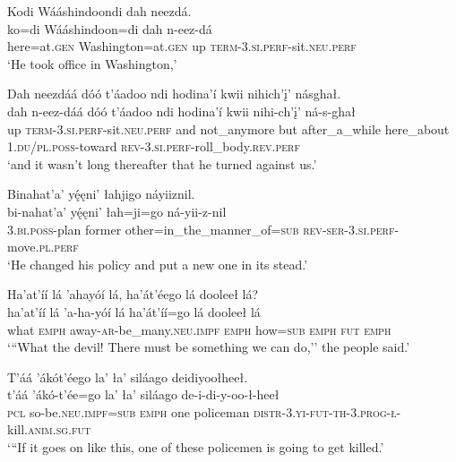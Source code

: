 \ea\label{ex:text7-6-2}
Kodi Wááshindoondi dah neezdá.\\
\gll ko=di	Wááshindoon=di	dah	n-eez-dá\\
     here=at.\textsc{gen}	Washington=at.\textsc{gen}	up	\textsc{term}-3.\textsc{si}.\textsc{perf}-sit.\textsc{neu}.\textsc{perf}\\
\glt `He took office in Washington,'
\z

\ea\label{ex:text7-6-3}
Dah neezdáá dóó t’áadoo ndi hodina’í kwii nihich’į’ násghał.\\
\gll dah	n-eez-dáá	dóó	t’áadoo	ndi	hodina’í	kwii	nihi-ch’į’	ná-s-ghał\\
     up	\textsc{term}-3.\textsc{si}.\textsc{perf}-sit.\textsc{neu}.\textsc{perf}	and	not\_anymore	but	after\_a\_while	here\_about	1.\textsc{du}/\textsc{pl}.\textsc{poss}-toward	\textsc{rev}-3.\textsc{si}.\textsc{perf}-roll\_body.\textsc{rev}.\textsc{perf}\\
\glt `and it wasn't long thereafter that he turned against us.'
\z

\ea\label{ex:text7-6-4}
Binahat’a’ yę́ęni’ łahjigo náyiiznil.\\
\gll bi-nahat’a’	yę́ęni’	łah=ji=go	ná-yii-z-nil\\
     3.\textsc{bi}.\textsc{poss}-plan	former	other=in\_the\_manner\_of=\textsc{sub}	\textsc{rev}-\textsc{ser}-3.\textsc{si}.\textsc{perf}-move.\textsc{pl}.\textsc{perf}\\
\glt `He changed his policy and put a new one in its stead.'
\z

\ea\label{ex:text7-6-5}
Ha’at’íí lá ’ahayóí lá, ha’át’éego lá dooleeł lá?\\
\gll ha’at’íí	lá	’a-ha-yóí	lá	ha’át’íí=go	lá	dooleeł	lá\\
     what	\textsc{emph}	away-\textsc{ar}-be\_many.\textsc{neu}.\textsc{impf}	\textsc{emph}	how=\textsc{sub}	\textsc{emph}	\textsc{fut}	\textsc{emph}\\
\glt `{``}What the devil! There must be something we can do,'' the people said.'
\z

\ea\label{ex:text7-6-6}
T’áá ’ákót’éego la’ ła’ siláago deidiyoołheeł.\\
\gll t’áá	’ákó-t’ée=go	la’	ła’	siláago	de-i-di-y-oo-ł-heeł\\
     \textsc{pcl}	so-be.\textsc{neu}.\textsc{impf}=\textsc{sub}	\textsc{emph}	one	policeman	\textsc{distr}-3.\textsc{yi}-\textsc{fut}-\textsc{th}-3.\textsc{prog}-\textsc{ł}-kill.\textsc{anim}.\textsc{sg}.\textsc{fut}\\
\glt `{``}If it goes on like this, one of these policemen is going to get killed.'
\z

